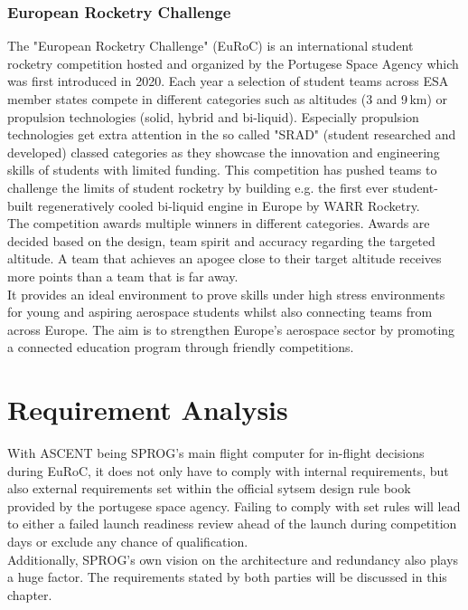 \documentclass[fontsize=11pt,%
twoside,%
BCOR          = 8mm, %
DIV           = 11,  %
titlepage     = off,%
index=totoc,%
xcolor        = pdftex,%
dvipsnames,%
bibliography  = totoc,%
bibliography = numbered, %
listof        = notnumbered]{scrreprt}
\begin{document}
\subsection{European Rocketry Challenge} \label{sec:euroc}
The "European Rocketry Challenge" (EuRoC) is an international student rocketry competition hosted and organized by the Portugese Space Agency which was first introduced in 2020. Each year a selection of student teams across ESA member states compete in different categories such as altitudes (3 and 9\,km) or propulsion technologies (solid, hybrid and bi-liquid). Especially propulsion technologies get extra attention in the so called "SRAD" (student researched and developed) classed categories as they showcase the innovation and engineering skills of students with limited funding. This competition has pushed teams to challenge the limits of student rocketry by building e.g. the first ever student-built regeneratively cooled bi-liquid engine in Europe by WARR Rocketry.\\
The competition awards multiple winners in different categories. Awards are decided based on the design, team spirit and accuracy regarding the targeted altitude. A team that achieves an apogee close to their target altitude receives more points than a team that is far away.\\
It provides an ideal environment to prove skills under high stress environments for young and aspiring aerospace students whilst also connecting teams from across Europe. The aim is to strengthen Europe's aerospace sector by promoting a connected education program through friendly competitions.


\newpage




\chapter{Requirement Analysis} \label{chap:Requirements}
With ASCENT being SPROG's main flight computer for in-flight decisions during EuRoC, it does not only have to comply with internal requirements, but also external requirements set within the official sytsem design rule book provided by the portugese space agency. Failing to comply with set rules will lead to either a failed launch readiness review ahead of the launch during competition days or exclude any chance of qualification.\\
Additionally, SPROG's own vision on the architecture and redundancy also plays a huge factor. The requirements stated by both parties will be discussed in this chapter.
\end{document}
